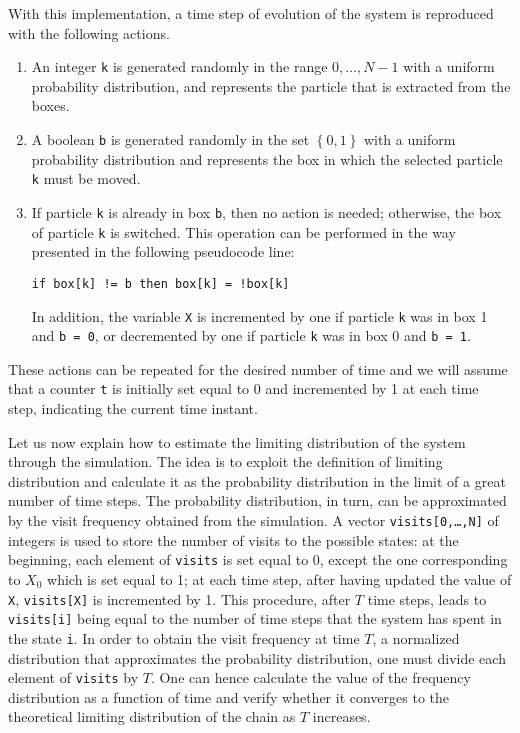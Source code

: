 With this implementation, a time step of evolution of the system is reproduced with the following actions. 

\begin{enumerate}
    \item An integer \texttt{k} is generated randomly in the range $0,\dots, N-1$ with a uniform probability distribution, and represents the particle that is extracted from the boxes.
    \item A boolean \texttt{b} is generated randomly in the set $\left\{0,1\right\}$ with a uniform probability distribution and represents the box in which the selected particle \texttt{k} must be moved.
    \item If particle \texttt{k} is already in box \texttt{b}, then no action is needed; otherwise, the box of particle \texttt{k} is switched. This operation can be performed in the way presented in the following pseudocode line:
    \begin{center}
        \texttt{if box[k] != b then box[k] = !box[k]}
    \end{center}
    In addition, the variable \texttt{X} is incremented by one if particle \texttt{k} was in box 1 and \texttt{b = 0}, or decremented by one if particle \texttt{k} was in box 0 and \texttt{b = 1}.
\end{enumerate}
These actions can be repeated for the desired number of time and we will assume that a counter \texttt{t} is initially set equal to 0 and incremented by 1 at each time step, indicating the current time instant.

Let us now explain how to estimate the limiting distribution of the system through the simulation. The idea is to exploit the definition of limiting distribution and calculate it as the probability distribution in the limit of a great number of time steps. The probability distribution, in turn, can be approximated by the visit frequency obtained from the simulation. A vector \texttt{visits[0,\dots,N]} of integers is used to store the number of visits to the possible states: at the beginning, each element of \texttt{visits} is set equal to 0, except the one corresponding to $X_0$ which is set equal to 1; at each time step, after having updated the value of \texttt{X}, \texttt{visits[X]} is incremented by 1. This procedure, after $T$ time steps, leads to \texttt{visits[i]} being equal to the number of time steps that the system has spent in the state \texttt{i}. In order to obtain the visit frequency at time $T$, \ie a normalized distribution that approximates the probability distribution, one must divide each element of \texttt{visits} by $T$. One can hence calculate the value of the frequency distribution as a function of time and verify whether it converges to the theoretical limiting distribution of the chain as $T$ increases.

